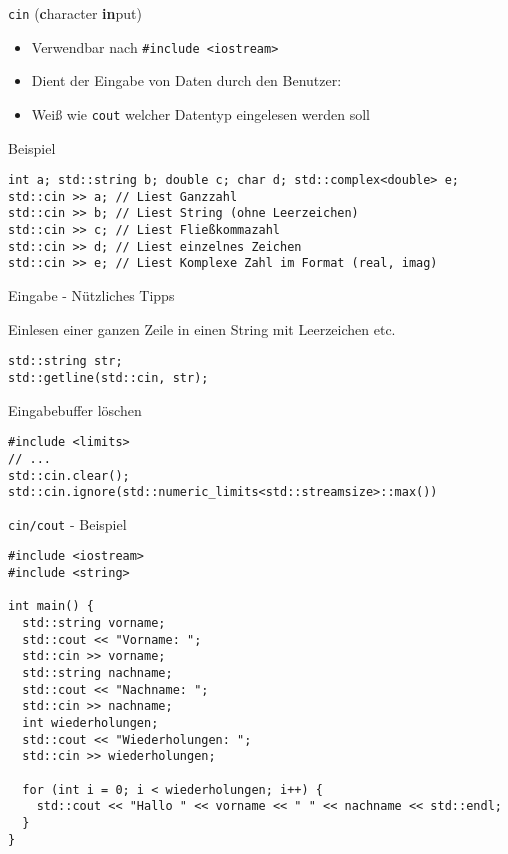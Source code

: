 \documentclass[presentation]{beamer}
\begin{document}
\begin{frame}[label={sec:org7c9b8ad},fragile]{\texttt{cin} (\textbf{c}haracter \textbf{in}put)}
 \begin{itemize}
\item Verwendbar nach {\color{solarizedYellow}\verb!#include <iostream>!}
\item Dient der \alert{Eingabe} von Daten durch den Benutzer: 
\item Weiß wie {\color{solarizedYellow}\verb!cout!} welcher Datentyp eingelesen werden soll
\end{itemize}
\begin{block}{Beispiel}
\begin{verbatim}
int a; std::string b; double c; char d; std::complex<double> e;
std::cin >> a; // Liest Ganzzahl
std::cin >> b; // Liest String (ohne Leerzeichen)
std::cin >> c; // Liest Fließkommazahl
std::cin >> d; // Liest einzelnes Zeichen
std::cin >> e; // Liest Komplexe Zahl im Format (real, imag)
\end{verbatim}
\end{block}
\end{frame}
\begin{frame}[label={sec:org1561245},fragile]{Eingabe - Nützliches Tipps}
 \begin{block}{Einlesen einer ganzen Zeile in einen String mit Leerzeichen etc.}
\begin{verbatim}
std::string str;
std::getline(std::cin, str);
\end{verbatim}
\end{block}
\begin{block}{Eingabebuffer löschen}
\begin{verbatim}
#include <limits>
// ...
std::cin.clear();
std::cin.ignore(std::numeric_limits<std::streamsize>::max())
\end{verbatim}
\end{block}
\end{frame}
\begin{frame}[label={sec:org42159a7},fragile]{\texttt{cin/cout} - Beispiel}
 \begin{verbatim}
#include <iostream>
#include <string>

int main() {
  std::string vorname;
  std::cout << "Vorname: ";
  std::cin >> vorname;
  std::string nachname;
  std::cout << "Nachname: ";
  std::cin >> nachname;
  int wiederholungen;
  std::cout << "Wiederholungen: ";
  std::cin >> wiederholungen;

  for (int i = 0; i < wiederholungen; i++) {
    std::cout << "Hallo " << vorname << " " << nachname << std::endl;
  }
}
\end{verbatim}
\end{frame}
\end{document}
